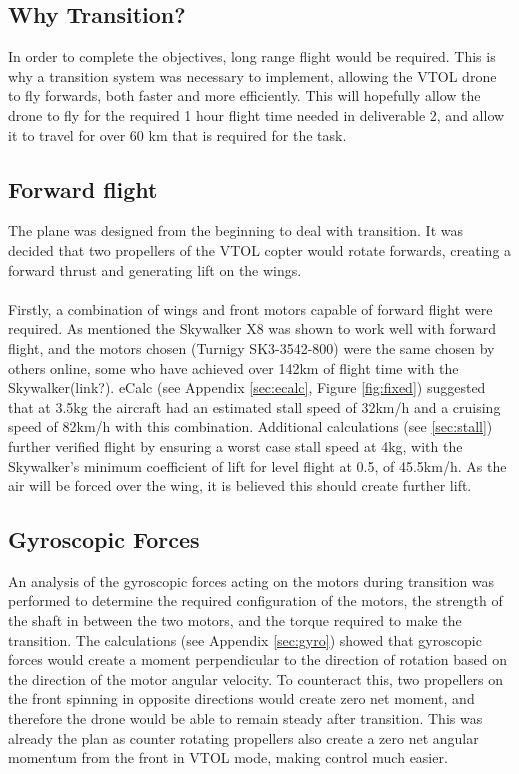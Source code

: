 

\subsection{Why Transition?}
In order to complete the objectives, long range flight would be required. This is why a transition system was necessary to implement, allowing the VTOL drone to fly forwards, both faster and more efficiently. This will hopefully allow the drone to fly for the required 1 hour flight time needed in deliverable 2, and allow it to travel for over 60 km that is required for the task. 

\subsection{Forward flight}
The plane was designed from the beginning to deal with transition. It was decided that two propellers of the VTOL copter would rotate forwards, creating a forward thrust and generating lift on the wings.  
\\\\
Firstly, a combination of wings and front motors capable of forward flight were required.  As mentioned the Skywalker X8 was shown to work well with forward flight, and the motors chosen (Turnigy SK3-3542-800) were the same chosen by others online, some who have achieved over 142km of flight time with the Skywalker(link?). eCalc (see Appendix \ref{sec:ecalc}, Figure \ref{fig:fixed}) suggested that at 3.5kg the aircraft had an estimated stall speed of 32km/h and a cruising speed of 82km/h with this combination. Additional calculations (see \ref{sec:stall}) further verified flight by ensuring a worst case stall speed at 4kg, with the Skywalker's minimum coefficient of lift for level flight at 0.5, of 45.5km/h. As the air will be forced over the wing, it is believed this should create further lift.

\subsection{Gyroscopic Forces}
An analysis of the gyroscopic forces acting on the motors during transition was performed to determine the required configuration of the motors, the strength of the shaft in between the two motors, and the torque required to make the transition. The calculations (see Appendix  \ref{sec:gyro}) showed that gyroscopic forces would create a moment perpendicular to the direction of rotation based on the direction of the motor angular velocity. To counteract this, two propellers on the front spinning in opposite directions would create zero net moment, and therefore the drone would be able to remain steady after transition. This was already the plan as counter rotating propellers also create a zero net angular momentum from the front in VTOL mode, making control much easier.\\

